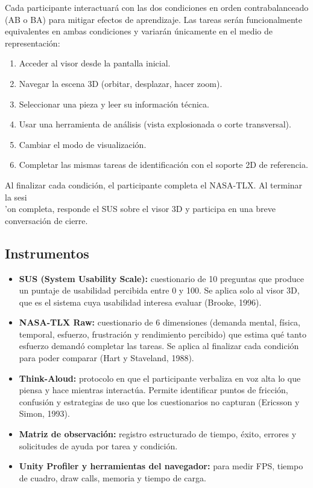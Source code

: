 Cada participante interactuar\'a con las dos condiciones en orden contrabalanceado (AB o BA) para mitigar efectos de aprendizaje. Las tareas ser\'an funcionalmente equivalentes en ambas condiciones y variar\'an \'unicamente en el medio de representaci\'on:

\begin{enumerate}
    \item Acceder al visor desde la pantalla inicial.
    \item Navegar la escena 3D (orbitar, desplazar, hacer zoom).
    \item Seleccionar una pieza y leer su informaci\'on t\'ecnica.
    \item Usar una herramienta de an\'alisis (vista explosionada o corte transversal).
    \item Cambiar el modo de visualizaci\'on.
    \item Completar las mismas tareas de identificaci\'on con el soporte 2D de referencia.
\end{enumerate}

Al finalizar cada condici\'on, el participante completa el NASA-TLX. Al terminar la sesi\\'on completa, responde el SUS sobre el visor 3D y participa en una breve conversaci\'on de cierre.

\subsection{Instrumentos}

\begin{itemize}
    \item \textbf{SUS (System Usability Scale):} cuestionario de 10 preguntas que produce un puntaje de usabilidad percibida entre 0 y 100. Se aplica solo al visor 3D, que es el sistema cuya usabilidad interesa evaluar (Brooke, 1996).
    \item \textbf{NASA-TLX Raw:} cuestionario de 6 dimensiones (demanda mental, f\'isica, temporal, esfuerzo, frustraci\'on y rendimiento percibido) que estima qu\'e tanto esfuerzo demand\'o completar las tareas. Se aplica al finalizar cada condici\'on para poder comparar (Hart y Staveland, 1988).
    \item \textbf{Think-Aloud:} protocolo en que el participante verbaliza en voz alta lo que piensa y hace mientras interact\'ua. Permite identificar puntos de fricci\'on, confusi\'on y estrategias de uso que los cuestionarios no capturan (Ericsson y Simon, 1993).
    \item \textbf{Matriz de observaci\'on:} registro estructurado de tiempo, \'exito, errores y solicitudes de ayuda por tarea y condici\'on.
    \item \textbf{Unity Profiler y herramientas del navegador:} para medir FPS, tiempo de cuadro, draw calls, memoria y tiempo de carga.
\end{itemize}

